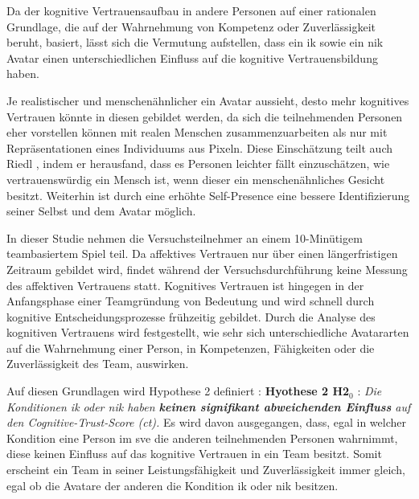 \documentclass[a4paper,11pt]{article}%
\renewcommand{\\}{\vspace*{0.5\baselineskip} \newline}
\begin{document}
Da der kognitive Vertrauensaufbau in andere Personen auf einer rationalen Grundlage, die auf der Wahrnehmung von Kompetenz oder Zuverlässigkeit beruht, basiert, lässt sich die Vermutung aufstellen, dass ein \ac{ik} sowie ein \ac{nik} Avatar einen unterschiedlichen Einfluss auf die kognitive Vertrauensbildung haben.

Je realistischer und menschenähnlicher ein Avatar aussieht, desto mehr kognitives Vertrauen könnte in diesen gebildet werden, da sich die teilnehmenden Personen eher vorstellen können mit realen Menschen zusammenzuarbeiten als nur mit Repräsentationen eines Individuums aus Pixeln. Diese Einschätzung teilt auch Riedl \cite{riedl2014trusting}, indem er herausfand, dass es Personen leichter fällt einzuschätzen, wie vertrauenswürdig ein Mensch ist, wenn dieser ein menschenähnliches Gesicht besitzt.
Weiterhin ist durch eine erhöhte Self-Presence eine bessere Identifizierung seiner Selbst und dem Avatar möglich. 

In dieser Studie nehmen die Versuchsteilnehmer an einem 10-Minütigem teambasiertem Spiel teil. Da affektives Vertrauen nur über einen längerfristigen Zeitraum gebildet wird, findet während der Versuchsdurchführung keine Messung des affektiven Vertrauens statt. 
Kognitives Vertrauen ist hingegen in der Anfangsphase einer Teamgründung von Bedeutung und wird schnell durch kognitive Entscheidungsprozesse frühzeitig gebildet. Durch die Analyse des kognitiven Vertrauens wird festgestellt, wie sehr sich unterschiedliche Avatararten auf die Wahrnehmung einer Person, in Kompetenzen, Fähigkeiten oder die Zuverlässigkeit des Team, auswirken.

Auf diesen Grundlagen wird Hypothese 2 definiert :
\\
\textbf{Hyothese 2 H2$_{0}$} : \textit{Die Konditionen \ac{ik} oder \ac{nik} haben \textbf{keinen signifikant abweichenden Einfluss} auf den Cognitive-Trust-Score (\ac{ct}).} \\
Es wird davon ausgegangen, dass, egal in welcher Kondition eine Person im \ac{sve} die \dq{}anderen\dq{} teilnehmenden Personen wahrnimmt, diese keinen Einfluss auf das kognitive Vertrauen in ein Team besitzt. Somit erscheint ein Team in seiner Leistungsfähigkeit und Zuverlässigkeit immer gleich, egal ob die Avatare der \dq{}anderen\dq{} die Kondition \ac{ik} oder \ac{nik} besitzen.

\end{document}
